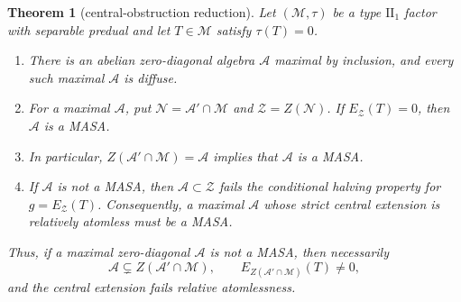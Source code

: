 \documentclass[11pt]{article}
\newtheorem{theorem}{Theorem}
\newcommand{\M}{\mathcal M}
\newcommand{\A}{\mathcal A}
\newcommand{\N}{\mathcal N}
\newcommand{\Z}{\mathcal Z}
\begin{document}
\begin{theorem}[central-obstruction reduction]\label{thm:main}
Let $(\M,\tau)$ be a type $\mathrm{II}_1$ factor with separable predual and
let $T\in\M$ satisfy $\tau(T)=0$.

\begin{enumerate}[label=(\roman*)]
\item There is an abelian zero-diagonal algebra $\A$ maximal by inclusion,
and every such maximal $\A$ is diffuse.
\item For a maximal $\A$, put $\N=\A'\cap\M$ and $\Z=Z(\N)$. If
$E_{\Z}(T)=0$, then $\A$ is a MASA.
\item In particular, $Z(\A'\cap\M)=\A$ implies that $\A$ is a MASA.
\item If $\A$ is not a MASA, then $\A\subset\Z$ fails the conditional halving
property for $g=E_{\Z}(T)$. Consequently, a maximal $\A$ whose strict central
extension is relatively atomless must be a MASA.
\end{enumerate}

Thus, if a maximal zero-diagonal $\A$ is not a MASA, then necessarily
\[
 \A\subsetneq Z(\A'\cap\M),\qquad E_{Z(\A'\cap\M)}(T)\ne0,
\]
and the central extension fails relative atomlessness.
\end{theorem}
\end{document}
